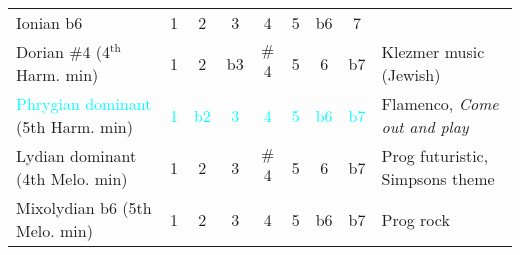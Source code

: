 \begin{table*}[!h]
\begin{adjustwidth}{-2.5cm}{}
\begin{tabular}{l|ccc cccc|l}
		\hline 
		\textcolor{yellow!90!black}{Ionian b6}    & \textcolor{yellow!90!black}{1} 
												   & \textcolor{yellow!90!black}{2}
												   & \textcolor{yellow!90!black}{3}
												   & \textcolor{yellow!90!black}{4}
												   & \textcolor{yellow!90!black}{5}
												   & \textcolor{yellow!90!black}{\textcolor{yellow!90!black}{b6}}
												   & \textcolor{yellow!90!black}{7}\\ 
		\textcolor{green!60!white!70!black}{Dorian {\footnotesize $\#$}4} (4$^{\textrm{th}}$ Harm. min) & \textcolor{green!60!white!70!black}{1} 
																							& \textcolor{green!60!white!70!black}{2}  
																							& \textcolor{green!60!white!70!black}{b3} 
																							& \textcolor{green!60!white!70!black}{\textcolor{green!60!white!70!black}{{\footnotesize $\#$}4}}
																							& \textcolor{green!60!white!70!black}{5}  
																							& \textcolor{green!60!white!70!black}{6}  
																							& \textcolor{green!60!white!70!black}{b7} 
																						    & Klezmer music (Jewish)\\
		\textcolor{cyan}{Phrygian dominant} (5th Harm. min) & \textcolor{cyan}{1} 
													  & \textcolor{cyan}{b2} 
													  & \textcolor{cyan}{\textcolor{cyan}{3}}
													  & \textcolor{cyan}{4} 
													  & \textcolor{cyan}{5}  
													  & \textcolor{cyan}{b6} 
													  & \textcolor{cyan}{b7} & Flamenco, \textit{Come out and play} \\
		\textcolor{blue!50!white}{Lydian dominant} (4th Melo. min)  & \textcolor{blue!50!white}{1} 
																	  & \textcolor{blue!50!white}{2}
																	  & \textcolor{blue!50!white}{3} 
																	  & \textcolor{blue!50!white}{{\footnotesize $\#$}4 }
																	  & \textcolor{blue!50!white}{5}
																	  & \textcolor{blue!50!white}{6} 
																	  & \textcolor{blue!50!white}{\textcolor{blue!50!white}{b7}}
																	  & Prog futuristic, Simpsons theme\\  
		\textcolor{blue!50!red!50!white}{Mixolydian b6} (5th Melo. min)  & \textcolor{blue!50!red!50!white}{1} 
																		   & \textcolor{blue!50!red!50!white}{2}  
																		   & \textcolor{blue!50!red!50!white}{\textcolor{blue!50!red!50!white}{3} }
																		   & \textcolor{blue!50!red!50!white}{4}
																		   & \textcolor{blue!50!red!50!white}{5} 
																		   & \textcolor{blue!50!red!50!white}{b6}  
																		   & \textcolor{blue!50!red!50!white}{b7} 
																		   & Prog rock \\

\end{tabular}
\end{adjustwidth}
\end{table*}
